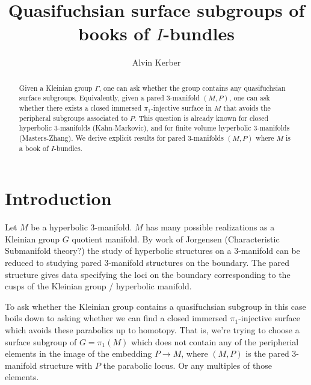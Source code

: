 \documentclass[12pt]{amsart}
\theoremstyle{definition}
\begin{document}
\title{Quasifuchsian surface subgroups of books of $I$-bundles}

\author{Alvin Kerber}

\begin{abstract}

Given a Kleinian group $\Gamma$, one can ask whether the group contains any
quasifuchsian surface subgroups. Equivalently, given a pared 3-manifold
$(M,P)$, one can ask whether there exists a closed immersed $\pi_1$-injective
surface in $M$ that avoids the peripheral subgroups associated to $P$.  This
question is already known for closed hyperbolic 3-manifolds (Kahn-Markovic),
and for finite volume hyperbolic 3-manifolds (Masters-Zhang).  We derive
explicit results for pared 3-manifolds $(M,P)$ where $M$ is a book of
$I$-bundles.

\end{abstract}

\maketitle
\section{Introduction}

Let $M$ be a hyperbolic 3-manifold. $M$ has many possible realizations as
a Kleinian group $G$ quotient manifold. By work of Jorgensen (Characteristic
Submanifold theory?) the study of hyperbolic structures on a 3-manifold can be
reduced to studying pared 3-manifold structures on the boundary. The pared
structure gives data specifying the loci on the boundary corresponding to the
cusps of the Kleinian group / hyperbolic manifold.

To ask whether the Kleinian group contains a quasifuchsian subgroup in this
case boils down to asking whether we can find a closed immersed
$\pi_1$-injective surface which avoids these parabolics up to homotopy. That
is, we're trying to choose a surface subgroup of $G=\pi_1(M)$ which does not
contain any of the peripherial elements in the image of the embedding $P\to M$,
where $(M,P)$ is the pared 3-manifold structure with $P$ the parabolic locus.
Or any multiples of those elements.
\end{document}
